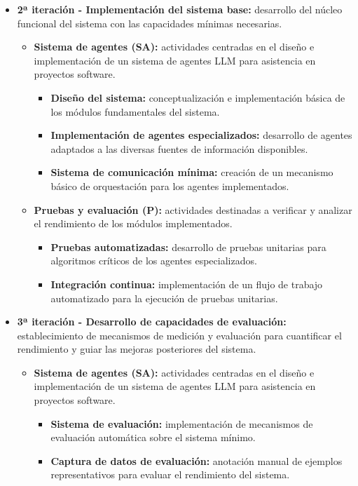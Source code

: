 \begin{itemize}
  \item\textbf{2ª iteración - Implementación del sistema base: }desarrollo del núcleo funcional del sistema con las capacidades mínimas necesarias.
    \begin{itemize}
      \item\textbf{Sistema de agentes (SA):} actividades centradas en el diseño e implementación de un sistema de agentes LLM para asistencia en proyectos software.
        \begin{itemize}
          \item\textbf{Diseño del sistema:} conceptualización e implementación básica de los módulos fundamentales del sistema.
          \item\textbf{Implementación de agentes especializados:} desarrollo de agentes adaptados a las diversas fuentes de información disponibles.
          \item\textbf{Sistema de comunicación mínima:} creación de un mecanismo básico de orquestación para los agentes implementados.
        \end{itemize}
      \item\textbf{Pruebas y evaluación (P):} actividades destinadas a verificar y analizar el rendimiento de los módulos implementados.
        \begin{itemize}
        \item\textbf{Pruebas automatizadas:} desarrollo de pruebas unitarias para algoritmos críticos de los agentes especializados.
        \item\textbf{Integración continua:} implementación de un flujo de trabajo automatizado para la ejecución de pruebas unitarias.
      \end{itemize}
    \end{itemize}
  \item\textbf{3ª iteración - Desarrollo de capacidades de evaluación: }establecimiento de mecanismos de medición y evaluación para cuantificar el rendimiento y guiar las mejoras posteriores del sistema.
    \begin{itemize}
      \item\textbf{Sistema de agentes (SA):} actividades centradas en el diseño e implementación de un sistema de agentes LLM para asistencia en proyectos software.
        \begin{itemize}
          \item\textbf{Sistema de evaluación:} implementación de mecanismos de evaluación automática sobre el sistema mínimo.
          \item\textbf{Captura de datos de evaluación:} anotación manual de ejemplos representativos para evaluar el rendimiento del sistema. 

\end{itemize}
\end{itemize}
\end{itemize}
